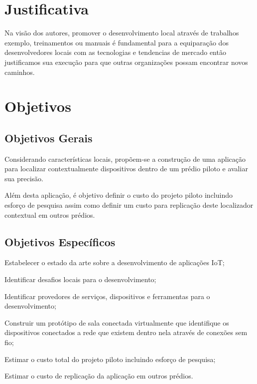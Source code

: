 \documentclass[
	12pt,				%
	openright,			%
	oneside,			%
	a4paper,			%
	chapter=TITLE,		%
	english,			%
	french,				%
	spanish,			%
	brazil				%
	]{abntex2}
\begin{document}
{%

\chapter{Justificativa}
Na visão dos autores, promover o desenvolvimento local através de trabalhos exemplo, treinamentos ou manuais é fundamental para a equiparação dos desenvolvedores locais com as tecnologias e tendencias de mercado então justificamos sua execução para que outras organizações possam encontrar novos caminhos.


\chapter{Objetivos}


\section{Objetivos Gerais}
Considerando características locais, propõem-se a construção de uma aplicação para localizar contextualmente dispositivos dentro de um prédio piloto e avaliar sua precisão.

Além desta aplicação, é objetivo definir o custo do projeto piloto incluindo esforço de pesquisa assim como definir um custo para replicação deste localizador contextual em outros prédios.


\section{Objetivos Específicos}

\begin{alineas}
	\item Estabelecer o estado da arte sobre a desenvolvimento de aplicações IoT;
	\item Identificar desafios locais para o desenvolvimento;
	\item Identificar provedores de serviços, dispositivos e ferramentas para o desenvolvimento;
	\item Construir um protótipo de sala conectada virtualmente que identifique os dispositivos conectados a rede que existem dentro nela através de conexões sem fio;
	\item Estimar o custo total do projeto piloto incluindo esforço de pesquisa;
	\item Estimar o custo de replicação da aplicação em outros prédios.
\end{alineas}

}
\end{document}
